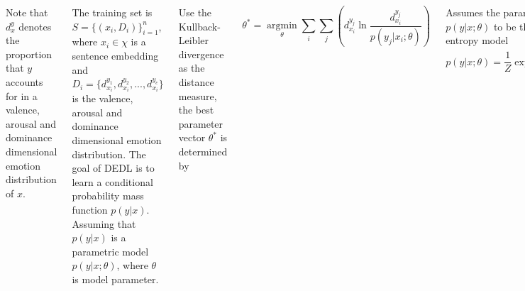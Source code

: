 \documentclass{tikzposter} %
\begin{document}
\begin{columns}
{  	Note that $ d^y_{x} $ denotes the proportion that 
  	$ y $ accounts for in a valence, 
  	arousal  and dominance dimensional emotion distribution
  	of $ x $.
  	
  	The training set is $ S = \{ ( x_{i} , D_{i} )  \}^{n}_{i=1} $,
  	where $ x_{i} \in \chi $ is a sentence embedding and
  	$ D_{i} = \{d^{y_{1}}_{x_{i}},  d^{y_{2}}_{x_{i}}, ... , d^{y_{c}}_{x_{i}}\} $
  	is the valence, arousal  and dominance dimensional emotion distribution.
  	The goal of DEDL is to 
  	learn a  conditional probability mass function $ p(y|x) $.
  	Assuming that $ p(y|x) $
  	is a parametric model $ p(y|x;{\theta}) $,
  	where $ \theta $ is model parameter.
  	
  	Use the Kullback-Leibler divergence	as 
  	the distance measure,
  	the best parameter vector $ \theta^{\ast} $ is determined by
  	
  	\begin{equation}\label{eq:kl_divergence}
  	\theta^{\ast} =
  	\mathop{\arg\min}\limits_{\theta}
  	\sum\limits_{i}
  	\sum\limits_{j}
  	(d^{y_{j}}_{ x_{ i } }
  	\ln \dfrac{ d^{y_{j}}_{ x_{ i } } }{ p( y_{ j } | x_{ i } ;{\theta}) })
  	\end{equation}
  	
  	Assumes the parametric model 
  	$ p(y|x;{\theta}) $ 
  	to be the maximum entropy model	
  	\begin{equation}
  		 p(y|x;{\theta}) = \dfrac{1}{Z}
  		\exp ( \sum\limits_{k}
  		{\theta}_{y,k} 
  		g_{k}( \textbf{x})  ) 
  	\end{equation}
  	
  	where $ Z = \sum _{y}
  	\sum_{k}  {\theta}_{y,k}  g_{k}( \textbf{x}) $
  	is a normalization factor,
  	$ {\theta}_{y,k} $ is an element in \textbf {$\theta$} ,
  	and $ g_{k}( \textbf{x}) $ is the \textit{k}-th feature of \textbf{ x }
  	
  	And for this problem,
  	the label distribution set $ D_{i} $ is that
  	$ D_{I} = \{d^{y_{v}}_{x_{i}},  d^{y_{a}}_{x_{i}}, d^{y_{d}}_{x_{i}}, d^{y_{n}}_{x_{i}}\} $,
  	where
  	$ d^{y_{v}}_{x_{i}} = \dfrac{score^{v}_{x_{i}}}{15} $,
  	$ d^{y_{v}}_{x_{i}} = \dfrac{score^{v}_{x_{i}}}{15} $,
  	$ d^{y_{v}}_{x_{i}} = \dfrac{score^{v}_{x_{i}}}{15} $,
  	and $ y_{n} = 1 - y_{v}  - y_{a} - y_{d} $.


\
}




\end{columns}
\end{document}
